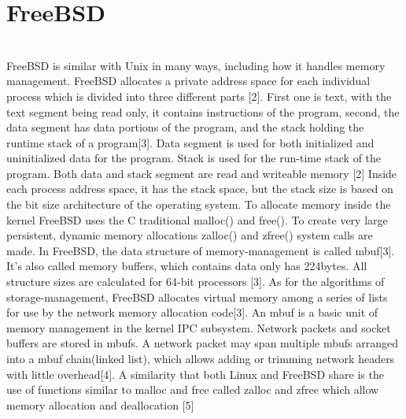 \documentclass[10pt,draftclsnofoot,peerreview,letterpaper,onecolumn,]{IEEEtran}
\begin{document}
\section{FreeBSD}
~\\FreeBSD is similar with Unix in many ways, including how it handles memory management. FreeBSD allocates a private address space for each individual process which is divided into three different parts [2]. First one is text, with the text segment being read only, it contains instructions of the program, second, the data segment has data portions of the program, and the stack holding the runtime stack of a program[3]. Data segment is used for both initialized and uninitialized data for the program. Stack is used for the run-time stack of the program. Both data and stack segment are read and writeable memory [2]
Inside each process address space, it has the stack space, but the stack size is based on the bit size architecture of the operating system. To allocate memory inside the kernel FreeBSD uses the C traditional malloc() and free(). To create very large persistent, dynamic memory allocations zalloc() and zfree() system calls are made. In FreeBSD, the data structure of memory-management is called mbuf[3]. It’s also called memory buffers, which contains data only has 224bytes. All structure sizes are calculated for 64-bit processors [3]. As for the algorithms of storage-management, FreeBSD allocates virtual memory among a series of lists for use by the network memory allocation code[3]. An mbuf is a basic unit of memory management in the kernel IPC subsystem. Network packets and socket buffers are stored in mbufs. A network packet may span multiple mbufs arranged into a mbuf chain(linked list), which allows adding or trimming network headers with little overhead[4].
A similarity that both Linux and FreeBSD share is the use of functions similar to malloc and free called zalloc and zfree which allow memory allocation and deallocation [5]
\end{document}
